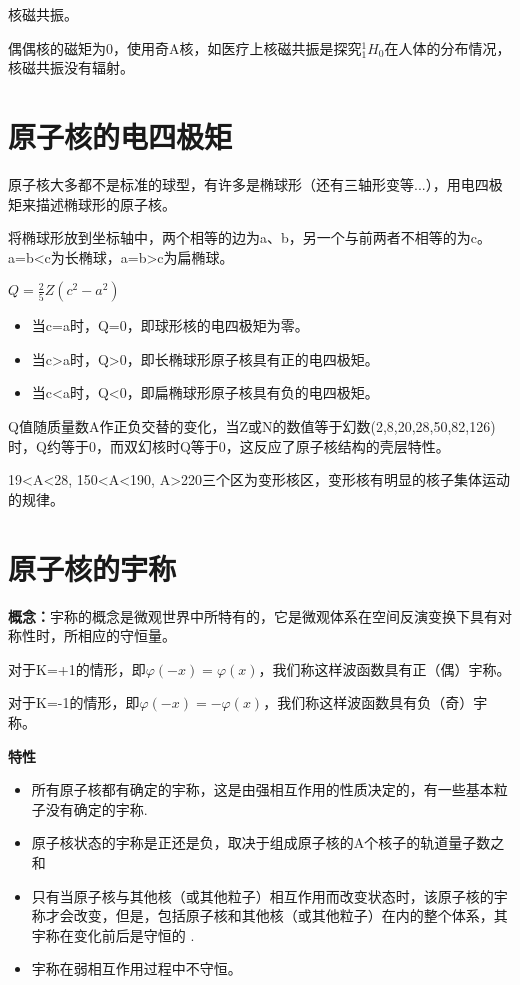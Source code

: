 核磁共振。

偶偶核的磁矩为0，使用奇A核，如医疗上核磁共振是探究$^1_1H_0$在人体的分布情况，核磁共振没有辐射。

\section{原子核的电四极矩}

原子核大多都不是标准的球型，有许多是椭球形（还有三轴形变等...），用电四极矩来描述椭球形的原子核。

将椭球形放到坐标轴中，两个相等的边为a、b，另一个与前两者不相等的为c。a=b<c为长椭球，a=b>c为扁椭球。

$Q=\frac{2}{5}Z(c^2-a^2)$

\begin{itemize}
    \item 当c=a时，Q=0，即球形核的电四极矩为零。
    \item 当c>a时，Q>0，即长椭球形原子核具有正的电四极矩。
    \item 当c<a时，Q<0，即扁椭球形原子核具有负的电四极矩。
\end{itemize}

Q值随质量数A作正负交替的变化，当Z或N的数值等于幻数(2,8,20,28,50,82,126)时，Q约等于0，而双幻核时Q等于0，这反应了原子核结构的壳层特性。

19<A<28, 150<A<190, A>220三个区为变形核区，变形核有明显的核子集体运动的规律。

\section{原子核的宇称}

\textbf{概念：}宇称的概念是微观世界中所特有的，它是微观体系在空间反演变换下具有对称性时，所相应的守恒量。

对于K=+1的情形，即$\varphi (-x) = \varphi (x)$，我们称这样波函数具有正（偶）宇称。

对于K=-1的情形，即$\varphi (-x) = -\varphi (x)$，我们称这样波函数具有负（奇）宇称。

\textbf{特性}

\begin{itemize}
    \item 所有原子核都有确定的宇称，这是由强相互作用的性质决定的，有一些基本粒子没有确定的宇称.
    \item 原子核状态的宇称是正还是负，取决于组成原子核的A个核子的轨道量子数之和
    \item 只有当原子核与其他核（或其他粒子）相互作用而改变状态时，该原子核的宇称才会改变，但是，包括原子核和其他核（或其他粒子）在内的整个体系，其宇称在变化前后是守恒的 .
    \item 宇称在弱相互作用过程中不守恒。
\end{itemize}

